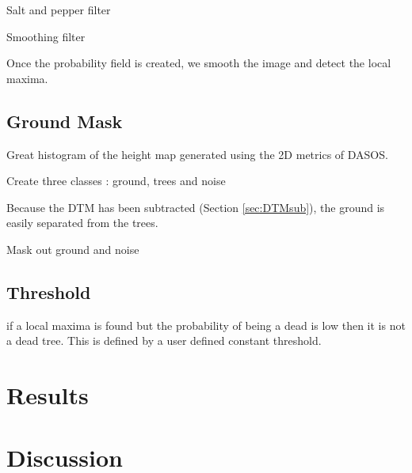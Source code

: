 \documentclass{subfiles}
\begin{document}
 \par Salt and pepper filter
 
 \par Smoothing filter 
 
 \par Once the probability field is created, we smooth the image and detect the local maxima.
 
 \subsection{Ground Mask}
 
 \par Great histogram of the height map generated using the 2D metrics of DASOS. 
 
 \par Create three classes : ground, trees and noise
 
 \par Because the DTM has been subtracted (Section \ref{sec:DTMsub}), the ground is easily separated from the trees. 
 
 \par Mask out  ground and noise
 
 \subsection{Threshold}
 
 \par if a local maxima is found but the probability of being a dead is low then it is not a dead tree. This is defined by a user defined constant threshold. 
 


\section{Results} 

		
		
\section{Discussion}
\end{document}
